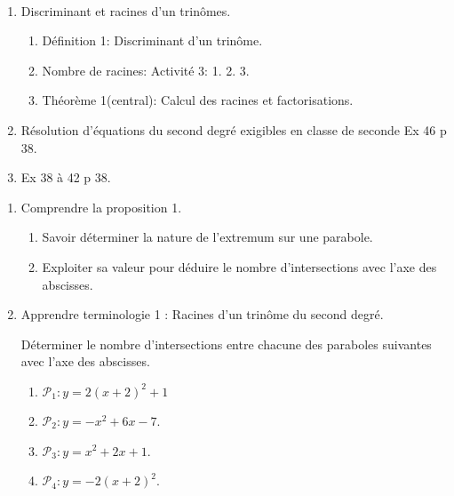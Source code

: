 \documentclass[a4paper,11pt]{article}
\title{}
\author{}
\date{}
\theoremstyle{break}
\newcounter{numero}
\newcommand{\exo}{
  \addtocounter{numero}{1}%
  \textbf{\underline{Exercice \arabic{numero}:}}\quad}
\begin{document}
  \setlength{\unitlength}{1mm}
  \setlength\parindent{0mm}
  
  
  ~
  \medskip
  
  \begin{enumerate}
    
    \item Discriminant et racines d'un trinômes.
    \begin{enumerate}
      \item Définition 1: Discriminant d'un trinôme.
      \item Nombre de racines: Activité 3: 1. 2. 3.
      \item Théorème 1(central): Calcul des racines et factorisations.
    \end{enumerate}
    \item Résolution d'équations du second degré exigibles en classe de seconde Ex 46 p 38.
    \item Ex 38 à 42 p 38.
  \end{enumerate}
  
  \begin{Dev*}
    
    \begin{enumerate}
      
      \item Comprendre la proposition 1.
      \begin{enumerate}
	\item Savoir déterminer la nature de l'extremum sur une parabole.
	\item Exploiter sa valeur pour déduire le nombre d'intersections 
	avec l'axe des abscisses.
      \end{enumerate}
      \item Apprendre terminologie 1 : Racines d'un trinôme du second degré.
      \vspace{0.5cm}
      
      \begin{dm}
	
	Déterminer le nombre d'intersections entre chacune des paraboles suivantes
	avec l'axe des abscisses.
	\begin{enumerate}
	  \item $\mathcal{P}_1:y=2(x+2)^2+1$
	  \item $\mathcal{P}_2:y=-x^2+6x-7$.%
	  \item $\mathcal{P}_3:y=x^2+2x+1$.
	  \item $\mathcal{P}_4:y=-2(x+2)^2$.
	\end{enumerate} 
      \end{dm}
      
      
      
    \end{enumerate}
  \end{Dev*}
  
  
  
  
\end{document}
